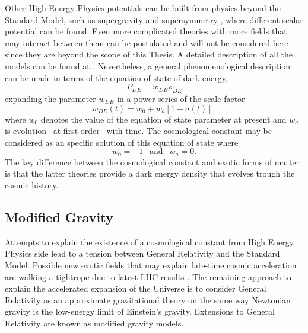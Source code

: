Other High Energy Physics potentials can be built from physics beyond the Standard Model, such us supergravity and supersymmetry \cite{1999PhLB..468...40B,1999astro.ph.12005B,2000PhRvD..61j3502B,1999PhRvD..60f3502B}, where different scalar potential can be found. Even more complicated theories with more fields that may interact between them can be postulated and will not be considered here since they are beyond the scope of this Thesis. A detailed description of all the models can be found at \cite{2010deto.book.....A}. Nevertheless, a general phenomenological description can be made in terms of the equation of state of dark energy,
\begin{equation}
P_{DE} = w_{DE}\rho_{DE}
\end{equation}
expanding the parameter $w_{DE}$ in a power series of the scale factor
\begin{equation}
w_{DE}(t) = w_0 +w_a[1-a(t)],
\end{equation}
where $w_0$ denotes the value of the equation of state parameter at present and $w_a$ is evolution --at first order-- with time. The cosmological constant may be considered as an specific solution of this equation of state where
\begin{equation}
w_0=-1\ \ \mbox{ and }\ \ w_a=0.
\end{equation}
The key difference between the cosmological constant and exotic forms of matter is that the latter theories provide a dark energy density that evolves trough the cosmic history.

\subsection{Modified Gravity}
Attempts to explain the existence of a cosmological constant from High Energy Physics side lead to a tension between General Relativity and the Standard Model. Possible new exotic fields that may explain late-time cosmic acceleration are walking a tightrope due to latest LHC results \cite{2015arXiv150603091B}. The remaining approach to explain the accelerated expansion of the Universe is to consider General Relativity as an approximate gravitational theory on the same way Newtonian gravity is the low-energy limit of Einstein's gravity. Extensions to General Relativity are known as modified gravity models.
\newline

